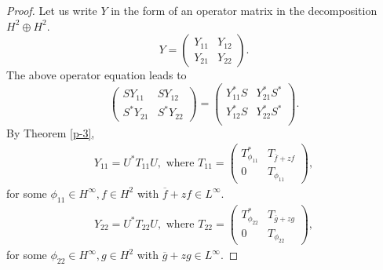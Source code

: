 \documentclass[10pt,a4paper]{amsart}
\begin{document}
        \begin{proof}
           Let us write $Y$ in the form of an operator matrix in the decomposition $H^2\oplus H^2$.
           \begin{equation*}
            Y=
               \begin{pmatrix}
                   Y_{11}&Y_{12}\\
                   Y_{21}&Y_{22}
               \end{pmatrix}.
           \end{equation*}
           The above operator equation leads to
           \begin{equation*}
                \begin{pmatrix}
                   SY_{11}&SY_{12}\\
                   S^*Y_{21}&S^*Y_{22}
               \end{pmatrix}
               =
               \begin{pmatrix}
                   Y^*_{11}S&Y^*_{21}S^*\\
                   Y^*_{12}S&Y^*_{22}S^*\\
               \end{pmatrix}.
           \end{equation*}
             By Theorem \ref{p-3}, 
             \begin{align*}
                 Y_{11}=U^*T_{11}U, \text{ where } T_{11}=
             \begin{pmatrix}
                 T^*_{\phi_{11}}&T_{\overline{f}+zf}\\
                 0&T_{\phi_{11}}
             \end{pmatrix},
             \end{align*}
             for some $\phi_{11} \in H^\infty, f \in H^2$ with $\overline{f}+zf \in L^\infty.$
             \begin{align*}
                 Y_{22}=U^*T_{22}U, \text{ where } T_{22}=
             \begin{pmatrix}
                 T^*_{\phi_{22}}&T_{\overline{g}+zg}\\
                 0&T_{\phi_{22}}
             \end{pmatrix},
             \end{align*}
             for some $\phi_{22} \in H^\infty, g \in H^2$ with $\overline{g}+zg\in L^\infty.$
             

\end{proof}
\end{document}
